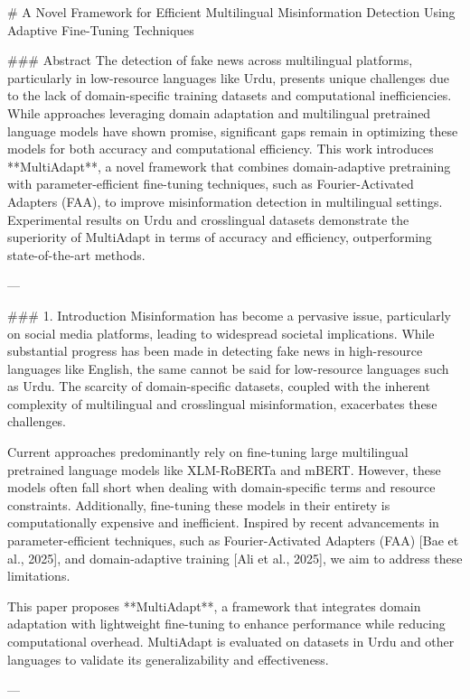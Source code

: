 # A Novel Framework for Efficient Multilingual Misinformation Detection Using Adaptive Fine-Tuning Techniques  

### Abstract  
The detection of fake news across multilingual platforms, particularly in low-resource languages like Urdu, presents unique challenges due to the lack of domain-specific training datasets and computational inefficiencies. While approaches leveraging domain adaptation and multilingual pretrained language models have shown promise, significant gaps remain in optimizing these models for both accuracy and computational efficiency. This work introduces **MultiAdapt**, a novel framework that combines domain-adaptive pretraining with parameter-efficient fine-tuning techniques, such as Fourier-Activated Adapters (FAA), to improve misinformation detection in multilingual settings. Experimental results on Urdu and crosslingual datasets demonstrate the superiority of MultiAdapt in terms of accuracy and efficiency, outperforming state-of-the-art methods.  

---

### 1. Introduction  
Misinformation has become a pervasive issue, particularly on social media platforms, leading to widespread societal implications. While substantial progress has been made in detecting fake news in high-resource languages like English, the same cannot be said for low-resource languages such as Urdu. The scarcity of domain-specific datasets, coupled with the inherent complexity of multilingual and crosslingual misinformation, exacerbates these challenges.  

Current approaches predominantly rely on fine-tuning large multilingual pretrained language models like XLM-RoBERTa and mBERT. However, these models often fall short when dealing with domain-specific terms and resource constraints. Additionally, fine-tuning these models in their entirety is computationally expensive and inefficient. Inspired by recent advancements in parameter-efficient techniques, such as Fourier-Activated Adapters (FAA) [Bae et al., 2025], and domain-adaptive training [Ali et al., 2025], we aim to address these limitations.  

This paper proposes **MultiAdapt**, a framework that integrates domain adaptation with lightweight fine-tuning to enhance performance while reducing computational overhead. MultiAdapt is evaluated on datasets in Urdu and other languages to validate its generalizability and effectiveness.  

---

